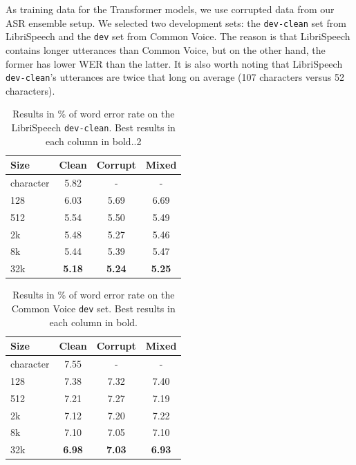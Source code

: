As training data for the Transformer models, we use corrupted data from our ASR ensemble setup. We selected two development sets: the \texttt{dev-clean} set from LibriSpeech and the \texttt{dev} set from Common Voice. The reason is that LibriSpeech contains longer utterances than Common Voice, but on the other hand, the former has lower WER than the latter. It is also worth noting that LibriSpeech \texttt{dev-clean}'s utterances are twice that long on average (107 characters versus 52 characters).


\begin{table}[p]
	\centering
	\begin{tabular}{l|ccc}
		\bf Size & \bf Clean & \bf Corrupt & \bf Mixed \\
		\hline
		character &  5.82  &  -  &  -  \\
		128 &  6.03  &  5.69  &  6.69  \\
		512 &    5.54  &  5.50   &  5.49 \\
		2k &  5.48  & 5.27  & 5.46  \\
		8k &  5.44  &   5.39 & 5.47  \\
		32k &  \textbf{5.18}  & \textbf{5.24}  &  \textbf{5.25} \\
		
	\end{tabular}
	\caption{Results in \% of word error rate on the LibriSpeech \texttt{dev-clean}. Best results in each column in bold..2}
	\label{tab:results_vocabularies_libri}
\end{table}

\begin{table}[p]
	\centering
	\begin{tabular}{l|ccc}
		\bf Size & \bf Clean & \bf Corrupt & \bf Mixed \\
		\hline
		character &  7.55  &  -  &  -  \\
		128 & 7.38   &  7.32  & 7.40  \\
		512 &  7.21  & 7.27   & 7.19  \\
		2k & 7.12   & 7.20 & 7.22  \\
		8k &  7.10  & 7.05  & 7.10  \\
		32k &  \textbf{6.98}  & \textbf{7.03}  &  \textbf{6.93} \\
		
	\end{tabular}
	\caption{Results in \% of word error rate on the Common Voice \texttt{dev} set. Best results in each column in bold.}
	\label{tab:results_vocabularies_common}
\end{table}

